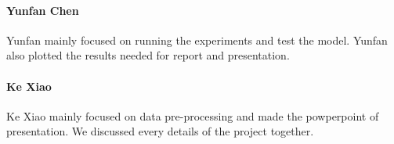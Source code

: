 \documentclass{article}
\begin{document}
\paragraph{Yunfan Chen} Yunfan mainly focused on running the experiments and test the model. Yunfan also plotted the results needed for report and presentation.

\paragraph{Ke Xiao} Ke Xiao mainly focused on data pre-processing and made the powperpoint of presentation. We discussed every details of the project together.



\end{document}

